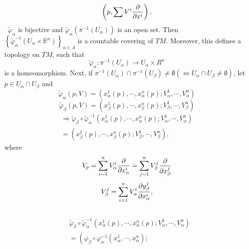 \begin{enumerate}[(1)]
\begin{itemize}
\[        \left(p,\sum V^i \pdv{x^i}\right)
        ,\]
        \ie\ \(\widetilde{\varphi}_\alpha\) is bijective and
        \(\widetilde{\varphi}_\alpha\left(\pi^{-1}\left(
            U_\alpha
        \right)\right)\) is an open set.
        Then \(\left\{\widetilde{\varphi}_\alpha^{-1}\left(
            U_\alpha\times \mathbb{R}^n
        \right)\right\}_{\alpha\in \Lambda}\)
        is a countable covering of \(TM\).
        Moreover, this defines a topology on \(TM\), such that
        \[
            \widetilde{\varphi}_\alpha\colon \pi^{-1} 
            \left(U_\alpha\right) \to U_\alpha \times{R}^n  
        \]
        is a homeomorphism.
        Next, if \(\pi^{-1}\left(U_\alpha \right)\cap
        \pi^{-1}\left(U_\beta\right)\neq \emptyset\left(
            \Leftrightarrow U_\alpha\cap U_\beta\neq \emptyset
        \right)\), let \(p\in U_\alpha\cap U_\beta\)
        and 
        \[
            \widetilde{\varphi}_\alpha(p,V)
            = \left(x^1_\alpha(p),
            \cdots,x^n_\alpha(p);
            V^1_\alpha,\cdots,V^n_\alpha
            \right)
        \]
        \[
            \widetilde{\varphi}_\beta(p,V)
            = \left(x^1_\beta(p),
            \cdots,x^n_\beta(p);
            V^1_\beta,\cdots,V^n_\beta
            \right) 
        \]
        \begin{align*}
            \Rightarrow
            \widetilde{\varphi}_\beta\circ 
            \widetilde{\varphi}_\alpha^{-1}
            \left(
                x^1_\alpha(p),
            \cdots,x^n_\alpha(p);
            V^1_\alpha,\cdots,V^n_\alpha
            \right)
            \\=
            \left(x^1_\beta(p),
            \cdots,x^n_\beta(p);
            V^1_\beta,\cdots,V^n_\beta
            \right), 
        \end{align*}
            where
            \[
                V_p=\sum_{i=1}^n V^i_\alpha \pdv{x_\alpha^i}
                =\sum_{j=1}^n V^j_\beta\pdv{x_\beta^j}  
            \]
            \[
                V^j_\beta=\sum_{i=1}^n V^i_\alpha 
                \pdv{y^j_\beta}{x^i_\alpha}    
            ,\]
        \ie\ 
        \begin{align*}
            &\widetilde{\varphi}_\beta\circ 
            \widetilde{\varphi}_\alpha^{-1}
            \left(
                x^1_\alpha(p),
            \cdots,x^n_\alpha(p);
            V^1_\alpha,\cdots,V^n_\alpha
            \right)
            \\&=
            \left(
                \varphi_\beta\circ \varphi_\alpha^{-1}
                \left(x^1_\alpha,\cdots,x^n_\alpha\right);

\end{align*}
\end{itemize}
\end{enumerate}
